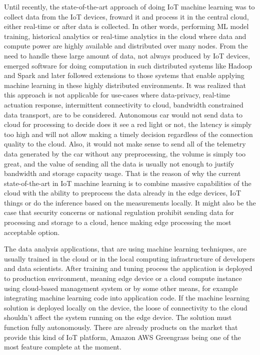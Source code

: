 \documentclass[english, 12pt, a4paper, elec, utf8, online]{aaltothesis}
\begin{document}
Until recently, the state-of-the-art approach of doing IoT machine learning was to collect data from the IoT devices, froward it and process it in the central cloud, either real-time or after data is collected. In other words, performing ML model training, historical analytics or real-time analytics in the cloud where data and compute power are highly available and distributed over many nodes. From the need to handle these large amount of data, not always produced by IoT devices, emerged software for doing computation in such distributed systems like Hadoop and Spark and later
followed extensions to those systems that enable applying machine learning in these highly distributed environments. It was realized that this approach is not applicable for use-cases where data-privacy, real-time actuation response, intermittent connectivity to cloud, bandwidth constrained data transport, are to be considered. Autonomous car would not send data to cloud for processing to decide does it see a red light or not, the latency is simply too high and will not allow making a timely decision regardless of the connection quality to the cloud. Also, it would not  make sense to send all of the telemetry data generated by the car without any preprocessing, the volume is simply too great, and the value of sending all the data is usually not enough to justify bandwidth and storage capacity usage. That is the reason of why the current state-of-the-art in IoT machine learning is to combine massive capabilities of the cloud with the ability to preprocess the data already in the edge devices, IoT things or do the inference based on the measurements locally.  It might also be the case that security concerns or national regulation prohibit sending data for processing and storage to a cloud, hence making edge processing the most acceptable option.~\cite{stolpe2016internet} 

The data analysis applications, that are using machine learning techniques, are usually trained in the cloud or in the local computing infrastructure of developers and data scientists. After training and tuning process the application is deployed to production environment, meaning edge device or a cloud compute instance using cloud-based management system or by some other means, for example integrating machine learning code into application code. If the machine learning solution is deployed locally on the device, the loose of connectivity to the cloud shouldn't affect the system running on the edge device. The solution must function fully autonomously. There are already products on the market that provide this kind of IoT platform, Amazon AWS Greengrass being one of the most feature complete at the moment.
\end{document}

